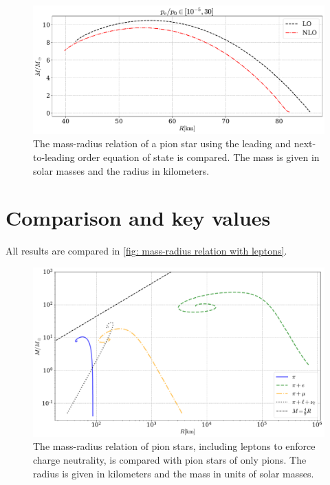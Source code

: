\begin{figure}[!htb]
    \centering
    \includegraphics[width=\textwidth]{../scripts/figurer/pion_star/mass_compare_order.pdf}
    \caption{
        The mass-radius relation of a pion star using the leading and next-to-leading order equation of state is compared. 
        The mass is given in solar masses and the radius in kilometers.}
    \label{fig: mass-radius relation compare nlo}
\end{figure}



\section{Comparison and key values}



All results are compared in \autoref{fig: mass-radius relation with leptons}.

\begin{figure}[!htb]
    \centering
    \includegraphics[width=\textwidth]{../scripts/figurer/pion_star/mass_radius_all.pdf}
    \caption{
        The mass-radius relation of pion stars, including leptons to enforce charge neutrality, is compared with pion stars of only pions.
        The radius is given in kilometers and the mass in units of solar masses.
        }
        \label{fig: mass-radius relation with leptons}
\end{figure}


